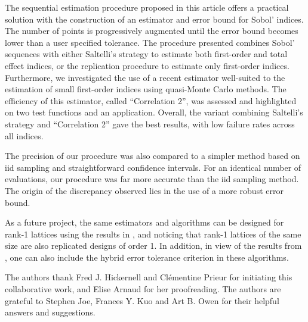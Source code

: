 The sequential estimation procedure proposed in this article offers a practical solution with the construction of an estimator and error bound for Sobol' indices. The number of points is progressively augmented until the error bound becomes lower than a user specified tolerance. The procedure presented combines Sobol' sequences with either Saltelli's strategy to estimate both first-order and total effect indices, or the replication procedure to estimate only first-order indices. Furthermore, we investigated the use of a recent estimator well-suited to the estimation of small first-order indices using quasi-Monte Carlo methods. The efficiency of this estimator, called ``Correlation 2'', was assessed and highlighted on two test functions and an application. Overall, the variant combining Saltelli's strategy and ``Correlation 2'' gave the best results, with low failure rates across all indices.

The precision of our procedure was also compared to a simpler method based on iid sampling and straightforward confidence intervals. For an identical number of evaluations, our procedure was far more accurate than the iid sampling method. The origin of the discrepancy observed lies in the use of a more robust error bound.

As a future project, the same estimators and algorithms can be designed for rank-1 lattices using the results in \cite{JimHic}, and noticing that rank-1 lattices of the same size are also replicated designs of order 1. In addition, in view of the results from \cite{HicJimLi}, one can also include the hybrid error tolerance criterion in these algorithms.

\begin{acknowledgements}
The authors thank Fred J. Hickernell and \break Cl\'ementine Prieur for initiating this collaborative work, and Elise \break Arnaud for her proofreading. The authors are grateful to Stephen Joe, Frances Y. Kuo and Art B. Owen for their helpful answers and suggestions.   
\end{acknowledgements}


